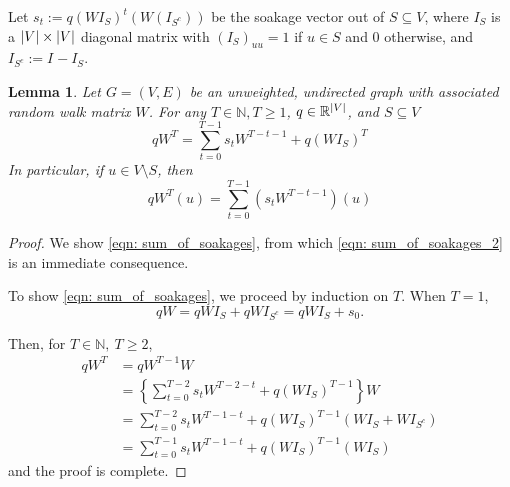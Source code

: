\documentclass[11pt,twoside]{article}
\newtheorem{lemma}{Lemma}
\DeclarePairedDelimiter\abs{\lvert}{\rvert}
\newcommand{\Reals}{\mathbb{R}}
\newcommand{\1}{\mathbf{1}}
\newcommand{\Wbf}{W}
\newcommand{\Ibf}[1]{I_{#1}}
\begin{document}
Let $s_t := q(\Wbf \Ibf{S})^t(\Wbf(\Ibf{S^c}))$ be the soakage vector out of $S \subseteq V$, where $\Ibf{S}$ is a $\abs{V} \times \abs{V}$ diagonal matrix with $(\Ibf{S})_{uu} = 1$ if $u \in S$ and 0 otherwise, and $\Ibf{S^c} := \Ibf{} - \Ibf{S}$. 
\begin{lemma}
	\label{lem: sum_of_soakages}
	Let $G = (V,E)$ be an unweighted, undirected graph with associated random walk matrix $\Wbf$. For any $T \in \mathbb{N}, T \geq 1$, $q \in \Reals^{\abs{V}}$, and $S \subseteq V$
	\begin{equation}
	\label{eqn: sum_of_soakages}
	q\Wbf^T = \sum_{t = 0}^{T - 1} s_t \Wbf^{T - t - 1} + q(\Wbf \Ibf{S})^T
	\end{equation}
	In particular, if $u \in V\setminus S$, then
	\begin{equation}
	\label{eqn: sum_of_soakages_2}
	q\Wbf^T(u) = \sum_{t = 0}^{T - 1} \left(s_t \Wbf^{T - t - 1}\right)(u)
	\end{equation}
\end{lemma}
\begin{proof}	
	We show \eqref{eqn: sum_of_soakages}, from which \eqref{eqn: sum_of_soakages_2} is an immediate consequence.
	
	
	To show \eqref{eqn: sum_of_soakages}, we proceed by induction on $T$. When $T = 1$,
	\begin{equation*}
	q\Wbf = q\Wbf\Ibf{S} + q\Wbf\Ibf{S^c} =  q\Wbf\Ibf{S} + s_0. 
	\end{equation*}
	
	Then, for $T \in \mathbb{N},~ T \geq 2$,
	\begin{align*}
	q\Wbf^{T} & = q\Wbf^{T - 1}{\Wbf} \\
	& = \left\{\sum_{t = 0}^{T - 2} s_t \Wbf^{T - 2 - t} + q(\Wbf \Ibf{S})^{T - 1} \right\} \Wbf \tag{by the inductive hypothesis}\\
	& = \sum_{t = 0}^{T - 2} s_t \Wbf^{T - 1 - t} + q(\Wbf \Ibf{S})^{T - 1} (\Wbf \Ibf{S} + \Wbf \Ibf{S^c}) \\
	& = \sum_{t = 0}^{T - 1} s_t \Wbf^{T - 1 - t} + q(\Wbf \Ibf{S})^{T - 1} (\Wbf \Ibf{S})
	\end{align*}
	and the proof is complete.
\end{proof}
\end{document}
